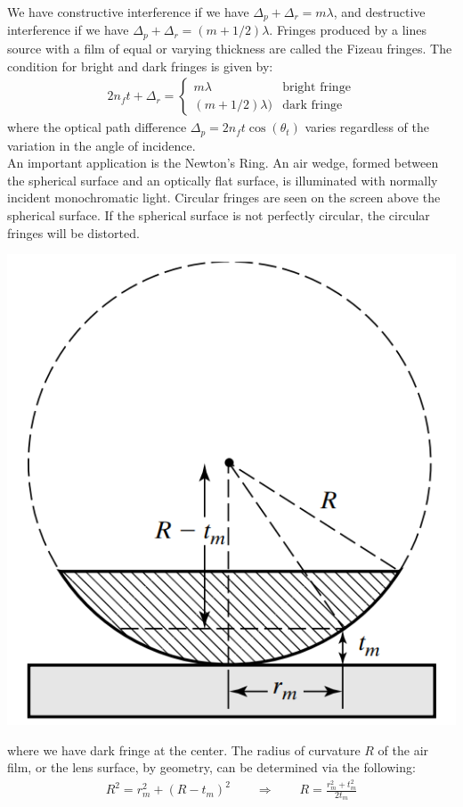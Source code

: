 \documentclass[11pt]{book}
\theoremstyle{break}
\theoremstyle{break}
\begin{document}
We have constructive interference if we have $\Delta_p + \Delta_r = m\lambda$, and destructive interference if we have $\Delta_p + \Delta_r = (m+1/2) \lambda$. Fringes produced by a lines source with a film of equal or varying thickness are called the Fizeau fringes. The condition for bright and dark fringes is given by:
\begin{align*}
2n_f t +\Delta_r = \begin{cases} m\lambda & \text{bright fringe}\\
(m+1/2) \lambda) & \text{dark fringe}
\end{cases}
\end{align*}
where the optical path difference $\Delta_p = 2n_f t\cos(\theta_t)$ varies regardless of the variation in the angle of incidence. \\

An important application is the Newton's Ring.  An air wedge, formed between the spherical surface and an optically flat surface, is illuminated with normally incident monochromatic light. Circular fringes are seen on the screen above the spherical surface. If the spherical surface is not perfectly circular, the circular fringes will be distorted. 
\begin{center}
\includegraphics[scale=0.55]{newton.png}
\end{center}
where we have dark fringe at the center. The radius of curvature $R$ of the air film, or the lens surface, by geometry, can be determined via the following:
\begin{align*}
R^2 = r_m^2 + (R-t_m)^2 \qquad\Rightarrow \qquad R = \frac{r_m^2 + t_m^2}{2t_m}
\end{align*}
\end{document}
